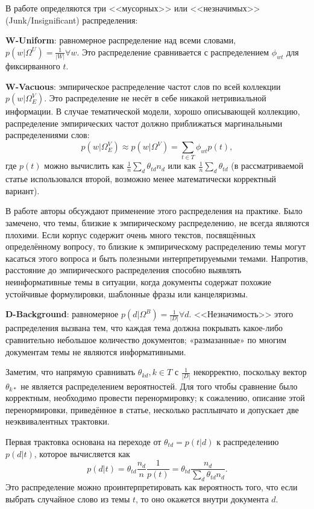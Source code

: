 В работе \cite{alsumait2009topic} определяются три <<мусорных>> или <<незначимых>> (Junk/Insignificant) распределения:

\textbf{W-Uniform}: равномерное распределение над всеми словами, $p(w|\Omega^U) = \frac{1}{|W|} \forall w$. Это распределение сравнивается с распределением $\phi_{wt}$ для фиксирванного $t$.

\textbf{W-Vacuous}: эмпирическое распределение частот слов по всей коллекции $p(w|\Omega^V_E)$. Это распределение не несёт в себе никакой нетривиальной информации. В случае тематической модели, хорошо описывающей коллекцию, распределение эмпирических частот должно приближаться маргинальными распределениями слов:
$$
    p(w|\Omega^V_E) \approx p(w|\Omega^V) = \sum_{t \in T} \phi_{wt}p(t),
$$
где $p(t)$ можно вычислить как $\frac{1}{n}\sum_d \theta_{td} n_d$ или как $\frac{1}{n}\sum_d \theta_{td}$ (в рассматриваемой статье использовался второй, возможно менее математически корректный вариант).

В работе \cite{boydcare} авторы обсуждают применение этого распределения на практике. Было замечено, что темы, близкие к эмпирическому распределению, не всегда являются плохими. Если корпус содержит очень много текстов, посвящённых определённому вопросу, то близкие к эмпирическому распределению темы могут касаться этого вопроса и быть полезными интерпретируемыми темами. Напротив, расстояние до эмпирического распределения способно выявлять неинформативные темы в ситуации, когда документы содержат похожие устойчивые формулировки, шаблонные фразы или канцеляризмы.

\textbf{D-Background}: равномерное $p(d|\Omega^B) = \frac{1}{|D|} \forall d$. <<Незначимость>> этого распределения вызвана тем, что каждая тема должна покрывать какое-либо сравнительно небольшое количество документов; «размазанные» по многим документам темы не являются информативными.

Заметим, что напрямую сравнивать $\theta_{k d}, k \in T$ с $\frac{1}{|D|}$ некорректно, поскольку вектор $\theta_{k \ast}$ не является распределением вероятностей. Для того чтобы сравнение было корректным, необходимо провести перенормировку; к сожалению, описание этой перенормировки, приведённое в статье, несколько расплывчато и допускает две неэквивалентных трактовки.

Первая трактовка основана на переходе от $\theta_{td} = p(t|d)$ к распределению $p(d|t)$, которое вычисляется как
$$
    p(d|t) = \theta_{td} \frac{n_d}{n} \frac{1}{p(t)} = \theta_{td} \frac{n_d}{\sum_d \theta_{td} n_d}.
$$
Это распределение можно проинтерпретировать как вероятность того, что если выбрать случайное слово из темы $t$, то оно окажется внутри документа $d$.

